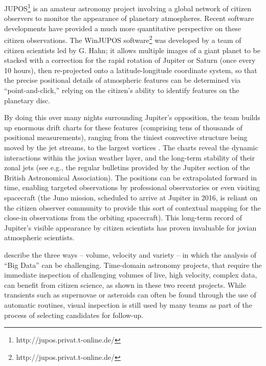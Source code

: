 \documentclass{ar2e}
\begin{document}
JUPOS\footnote{http://jupos.privat.t-online.de/} is an amateur astronomy
project involving a global network of citizen observers to monitor the
appearance of planetary atmospheres.  Recent software developments have
provided a much more quantitative perspective on these citizen observations.
The WinJUPOS software\footnote{http://jupos.privat.t-online.de/} was developed
by a team of citizen scientists led by G. Hahn; it allows multiple images of a
giant planet to be stacked with a correction for the rapid rotation of Jupiter
or Saturn  (once every 10 hours), then re-projected onto a latitude-longitude
coordinate system, so that the precise positional details of atmospheric
features can be determined via ``point-and-click,'' relying on the citizen's
ability to identify features on the planetary disc.  

By doing this over many nights surrounding Jupiter's opposition, the team
builds up enormous drift charts for these features (comprising tens of
thousands of positional measurements), ranging from the tiniest convective
structure being moved by the jet streams, to the largest vortices
\citep[e.g.][]{WinJUPOSRedSpot}.  The charts reveal the dynamic interactions
within the jovian weather layer, and the long-term stability of their zonal
jets (see e.g., the regular bulletins provided by the Jupiter section of the
British Astronomical Association). The positions can be extrapolated forward
in time, enabling targeted observations by professional observatories or even
visiting spacecraft (the Juno mission, scheduled to arrive at Jupiter in 2016,
is reliant on the citizen observer community to provide this sort of
contextual mapping for the close-in observations from the orbiting
spacecraft).  This long-term record of Jupiter's visible appearance by citizen
scientists has proven invaluable for jovian atmospheric scientists.


  \label{SNZoo} 
\citet{threeVs} describe the three ways -- volume, velocity and variety -- in
which the analysis of ``Big Data'' can be challenging. Time-domain astronomy
projects, that require the immediate inspection of challenging volumes of live,
high velocity, complex data, can benefit from citizen science, as shown in these
two recent projects.  While transients such as supernovae or asteroids can often
be found through the use of automatic routines, visual inspection is still used
by many teams as part of the process of selecting candidates for follow-up. 
\end{document}
